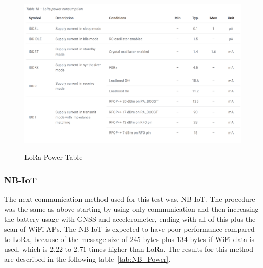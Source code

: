 \begin{figure}[htbp]
  \centering
  
    {\includegraphics[width=0.91\linewidth]{Chapters/Figures/Lora2.PNG}}%
 
  \caption{LoRa Power Table~\cite{Microcontroller2017}}
  \label{fig:LoRaPowerTable}
\end{figure}

\subsubsection{NB-IoT}
\label{subsec:NB} 

The next communication method used for this test was, NB-IoT. The procedure was the same as above starting by using only communication and then increasing the battery usage with GNSS and accelerometer, ending with all of this plus the scan of WiFi APs. The NB-IoT is expected to have poor performance compared to LoRa, because of the message size of $245$ bytes plus $134$ bytes if WiFi data is used, which is $2.22$ to $2.71$ times higher than LoRa. The results for this method are described in the following table~\ref{tab:NB_Power}.

